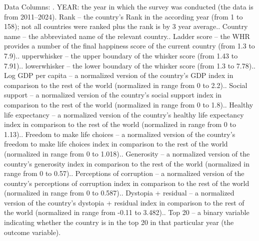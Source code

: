 \documentclass[
]{article}
\begin{document}
Data Columns: . YEAR: the year in which the survey was conducted (the data is from
2011--2024). Rank -- the country's Rank in the according year (from 1 to 158); not
all countries were ranked plus the rank is by 3 year average.. Country name -- the abbreviated name of the relevant
country.. Ladder score -- the WHR provides a number of the final happiness
score of the current country (from 1.3 to 7.9).. upperwhisker -- the upper boundary of the whisker score (from 1.43 to
7.91).. lowerwhisker -- the lower boundary of the whisker score (from 1.3 to
7.78).. Log GDP per capita -- a normalized version of the country's GDP index
in comparison to the rest of the world (normalized in range from 0 to
2.2).. Social support -- a normalized version of the country's social
support index in comparison to the rest of the world (normalized in
range from 0 to 1.8).. Healthy life expectancy -- a normalized version of the country's
healthy life expectancy index in comparison to the rest of the world
(normalized in range from 0 to 1.13).. Freedom to make life choices -- a normalized version of the
country's freedom to make life choices index in comparison to the rest
of the world (normalized in range from 0 to 1.018).. Generosity -- a normalized version of the country's generosity index
in comparison to the rest of the world (normalized in range from 0 to
0.57).. Perceptions of corruption -- a normalized version of the country's
perceptions of corruption index in comparison to the rest of the world
(normalized in range from 0 to 0.587).. Dystopia + residual -- a normalized version of the country's
dystopia + residual index in comparison to the rest of the world
(normalized in range from -0.11 to 3.482).. Top 20 -- a binary variable indicating whether the country is in the
top 20 in that particular year (the outcome variable).\newline  
\end{document}

